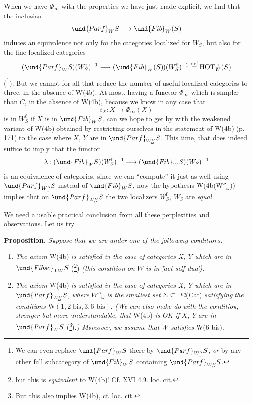 When we have $\Phi_\infty$ with the properties we have just made explicit, we find that the inclusion
\[
\und{Parf}_W S \longrightarrow \und{Fib}_W(S)
\]
induces an equivalence not only for the categories localized for $W_S$, but also for the fine localized categories
\[
(\und{Parf}_W S)(W_S^{\mathrm{f}})^{-1} \longrightarrow (\und{Fib}_W(S))(W_S^{\mathrm{f}})^{-1} \overset{\text{def}}{=} \mathrm{HOT}^{\mathrm{lc}}_W(S)
\]
(\footnote[94]{We can even replace $\und{Parf}_W S$ there by $\und{Parf}_{W''_\omega} S$, \textit{or} by any other full subcategory of $\und{Fib}_W S$ containing $\und{Parf}_{W''_\omega} S$.}). But we cannot for all that reduce the number of useful localized categories to three, in the absence of W(4b). At most, having a functor $\Phi_\infty$ which is simpler than $C$, in the absence of W(4b), because we know in any case that
\[
i_X : X \longrightarrow \Phi_\infty(X)
\]
is in $W_S^{\mathrm{f}}$ if $X$ is in $\und{Fib}_W S$, can we
hope to get by with the weakened variant of W(4b) obtained by restricting ourselves in the statement of W(4b) (p. 171) to the case where $X$, $Y$ are in $\und{Parf}_{W''_\omega} S$. This time, that does indeed suffice to imply that the functor
\[
\lambda : (\und{Fib}_W S)(W_S^{\mathrm{f}})^{-1} \longrightarrow (\und{Fib}_W S)(W_S)^{-1}
\]
is an equivalence of categories, since we can ``compute'' it just as well using $\und{Parf}_{W''_\omega} S$ instead of $\und{Fib}_W S$, now the hypothesis W(4b($\mathrm{W}''_\omega$)) implies that on $\und{Parf}_{W''_\omega} S$ the two localizers $W_S^{\mathrm{f}}$, $W_S$ are \textit{equal.}

We need a usable practical conclusion from all these perplexities and observations. Let us try

\textbf{Proposition.} \textit{Suppose that we are under one of the following conditions.}

\begin{enumerate}[label={}]
\item[$1^o$)] \textit{The axiom} W(4b) \textit{is satisfied in the case of categories $X$, $Y$ which are in} $\und{Fibsc}_{0,W} S$ (\footnote[95]{but this is \textit{equivalent} to W(4b)! Cf. XVI 4.9. loc. cit.}) \textit{(this condition on $W$ is in fact self-dual).}

\item[$2^o$)] \textit{The axiom} W(4b) \textit{is satisfied in the case of categories $X$, $Y$ which are in} $\und{Parf}_{W''_\omega} S$\textit{, where $W''_\omega$ is the smallest set $\Sigma \subseteq$ Fl}(Cat) \textit{satisfying the conditions} $\mathrm{W}(1, 2\text{ bis}, 3, 6\text{ bis})$. \textit{(We can also make do with the condition, stronger but more understandable, that} W(4b) \textit{is OK if $X$, $Y$ are in} $\und{Parf}_W S$ (\footnote[96]{But this also implies W(4b), cf. loc. cit.}).\textit{) Moreover, we assume that $W$ satisfies} W(6 bis).
\end{enumerate}

